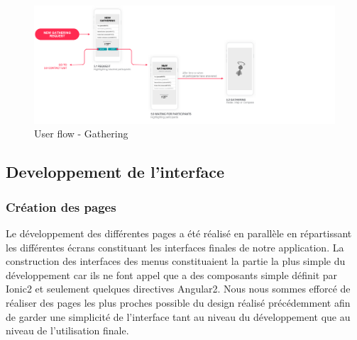 \documentclass[french]{article}
\begin{document}
	\begin{figure}[H]
		\centering
		\includegraphics[scale=0.6]{../user-flow/user-flow-5.png}
		\caption{User flow - Gathering}
		\label{User flow - Gathering}
	\end{figure}
	
	
	\subsection{Developpement de l'interface}
	\subsubsection{Création des pages}
	
	Le développement des différentes pages a été réalisé en parallèle en répartissant les différentes écrans constituant les interfaces finales de notre application.
	La construction des interfaces des menus constituaient la partie la plus simple du développement car ils ne font appel que a des composants simple définit par Ionic2 et seulement quelques directives Angular2. 
	Nous nous sommes efforcé de réaliser des pages les plus proches possible du design réalisé précédemment afin de garder une simplicité de l'interface tant au niveau du développement que au niveau de l'utilisation finale. 
	
\end{document}
